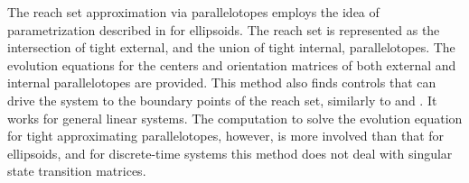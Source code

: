 The reach set approximation via parallelotopes \cite{KOSTOUSOVA_CONTROL_SYNTHESIS_VIA_PARALLELOTOPES} employs
the idea of parametrization described in \cite{KURZHANSKI_VARAIYA_ON_ELLIPSOIDAL_TECHNIQUES_FOR_REACHABILITY_ANALYSIS} for ellipsoids.
The reach set is represented as the intersection of tight external,
and the union of tight internal, parallelotopes.
The evolution equations for the centers and
orientation matrices of both external and internal parallelotopes are
provided. This method also finds controls that can drive the system to
the boundary points of the reach set, similarly to \cite{VARAIYA_REACH_SET_COMPUTATION}
and \cite{KURZHANSKI_VARAIYA_ON_ELLIPSOIDAL_TECHNIQUES_FOR_REACHABILITY_ANALYSIS}. It works for general linear systems.  The
computation to solve the evolution equation for tight approximating
parallelotopes, however, is more involved than that for ellipsoids,
and for discrete-time systems this method does not deal with singular state
transition matrices.

